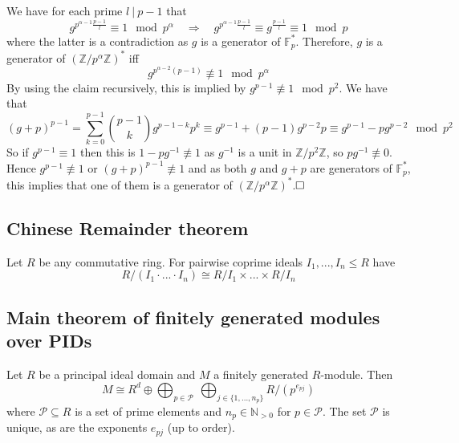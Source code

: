 \documentclass{scrartcl}
\newcommand{\N}{\mathbb{N}}
\newcommand{\Z}{\mathbb{Z}}
\newcommand{\divides}{\ | \ }
\begin{document}
We have for each prime $l \divides p - 1$ that
\begin{equation*}
    g^{p^{\alpha - 1} \frac {p - 1} l} \equiv 1 \mod p^\alpha \quad \Rightarrow \quad g^{p^{\alpha - 1} \frac {p - 1} l} \equiv g^{\frac {p - 1} l} \equiv 1 \mod p
\end{equation*}
where the latter is a contradiction as $g$ is a generator of $\mathbb{F}_p^*$. Therefore, $g$ is a generator of $(\Z/p^\alpha\Z)^*$ iff 
\begin{equation*}
    g^{p^{\alpha - 2} (p - 1)} \not\equiv 1 \mod p^\alpha
\end{equation*}
By using the claim recursively, this is implied by $g^{p - 1} \not\equiv 1 \mod p^2$. We have that
\begin{equation*}
    (g + p)^{p - 1} = \sum_{k = 0}^{p - 1} \binom{p - 1}{k} g^{p - 1 - k} p^k \equiv g^{p - 1} + (p - 1)g^{p - 2}p \equiv g^{p - 1} - p g^{p - 2} \mod p^2
\end{equation*}
So if $g^{p - 1} \equiv 1$ then this is $1 - p g^{-1} \not\equiv 1$ as $g^{-1}$ is a unit in $\Z/p^2\Z$, so $p g^{-1} \not\equiv 0$. 
Hence $g^{p - 1} \not\equiv 1$ or $(g + p)^{p - 1} \not\equiv 1$ and as both $g$ and $g + p$ are generators of $\mathbb{F}_p^*$, this implies that one of them is a generator of $(\Z/p^\alpha\Z)^*$.$\hfill\square$

\subsection{Chinese Remainder theorem}
Let $R$ be any commutative ring. For pairwise coprime ideals $I_1, ..., I_n \leq R$ have
\begin{equation*}
    R/(I_1 \cdot ... \cdot I_n) \cong R/I_1 \times ... \times R/I_n
\end{equation*}

\subsection{Main theorem of finitely generated modules over PIDs}
Let $R$ be a principal ideal domain and $M$ a finitely generated $R$-module. Then
\begin{equation*}
    M \cong R^d \oplus \bigoplus_{p \in \mathcal{P}} \ \bigoplus_{j \in \{1, ..., n_p\}} R / \left( p^{e_{pj}} \right)
\end{equation*}
where $\mathcal{P} \subseteq R$ is a set of prime elements and $n_p \in \N_{>0}$ for $p \in \mathcal{P}$. The set $\mathcal{P}$ is unique, as are the exponents $e_{pj}$ (up to order).
\end{document}
